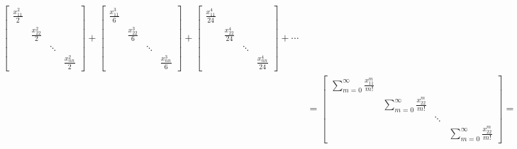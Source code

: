 \begin{align*}
    \begin{bmatrix}
        \frac{x_{11}^{2}}{2} &                      &        &                      \\
                             & \frac{x_{22}^{2}}{2} &        &                      \\
                             &                      & \ddots &                      \\
                             &                      &        & \frac{x_{nn}^{2}}{2}
    \end{bmatrix}  +
    \begin{bmatrix}
        \frac{x_{11}^{3}}{6} &                      &        &                      \\
                             & \frac{x_{22}^{3}}{6} &        &                      \\
                             &                      & \ddots &                      \\
                             &                      &        & \frac{x_{nn}^{3}}{6}
    \end{bmatrix} +
    \begin{bmatrix}
        \frac{ x_{11}^{4}}{24} &                       &        &                       \\
                               & \frac{x_{22}^{4}}{24} &        &                       \\
                               &                       & \ddots &                       \\
                               &                       &        & \frac{x_{nn}^{4}}{24}
    \end{bmatrix} + \cdots                                    \\
          & = \begin{bmatrix}
        \sum_{m=0}^{\infty} \frac{x_{11}^m}{m!} &                                         &        &                                         \\
                                                & \sum_{m=0}^{\infty} \frac{x_{22}^m}{m!} &        &                                         \\
                                                &                                         & \ddots &                                         \\
                                                &                                         &        & \sum_{m=0}^{\infty} \frac{x_{22}^m}{m!}
    \end{bmatrix}   =   \begin{bmatrix}
        e^{x_{11}} &             &        &            \\
                   & e^{x_{22} } &        &            \\
                   &             & \ddots &            \\
                   &             &        & e^{x_{nn}}
    \end{bmatrix} \\
\end{align*}
